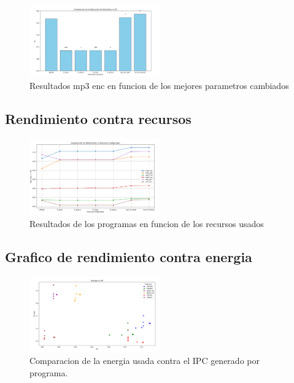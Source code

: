 \documentclass[conference]{IEEEtran}
\begin{document}
\newpage
\begin{figure}[htbp]
\centering
\includegraphics[width=0.5\textwidth]{Barras_IPC_6.png}
\caption{Resultados mp3 enc en funcion de los mejores parametros cambiados}
\label{fig:example}
\end{figure}

\subsection{Rendimiento contra recursos}
\begin{figure}[htbp]
\centering
\includegraphics[width=0.5\textwidth]{Lineas_IPC.png}
\caption{Resultados de los programas en funcion de los recursos usados}
\label{fig:example}
\end{figure}

\subsection{Grafico de rendimiento contra energia}
\begin{figure}[htbp]
\centering
\includegraphics[width=0.5\textwidth]{Plotter_IPC_Energy.png}
\caption{Comparacion de la energia usada contra el IPC generado por programa.}
\label{fig:example}
\end{figure}
\newpage
\end{document}
